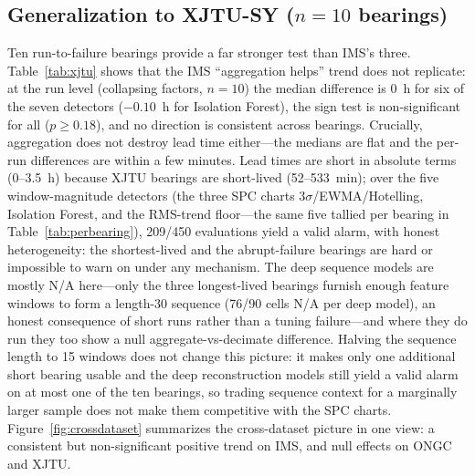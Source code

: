\documentclass[IJPHM, 2026, 0]{PHMSociety}
\begin{document}
\subsection{Generalization to XJTU-SY ($n=10$ bearings)}
Ten run-to-failure bearings provide a far stronger test than IMS's three. Table~\ref{tab:xjtu} shows that the IMS ``aggregation helps'' trend does not replicate: at the run level (collapsing factors, $n=10$) the median difference is 0~h for six of the seven detectors ($-0.10$~h for Isolation Forest), the sign test is non-significant for all ($p \ge 0.18$), and no direction is consistent across bearings. Crucially, aggregation does not destroy lead time either---the medians are flat and the per-run differences are within a few minutes. Lead times are short in absolute terms (0--3.5~h) because XJTU bearings are short-lived (52--533~min); over the five window-magnitude detectors (the three SPC charts $3\sigma$/EWMA/Hotelling, Isolation Forest, and the RMS-trend floor---the same five tallied per bearing in Table~\ref{tab:perbearing}), 209/450 evaluations yield a valid alarm, with honest heterogeneity: the shortest-lived and the abrupt-failure bearings are hard or impossible to warn on under any mechanism. The deep sequence models are mostly N/A here---only the three longest-lived bearings furnish enough feature windows to form a length-30 sequence (76/90 cells N/A per deep model), an honest consequence of short runs rather than a tuning failure---and where they do run they too show a null aggregate-vs-decimate difference. Halving the sequence length to 15 windows does not change this picture: it makes only one additional short bearing usable and the deep reconstruction models still yield a valid alarm on at most one of the ten bearings, so trading sequence context for a marginally larger sample does not make them competitive with the SPC charts. Figure~\ref{fig:crossdataset} summarizes the cross-dataset picture in one view: a consistent but non-significant positive trend on IMS, and null effects on ONGC and XJTU.
\end{document}
